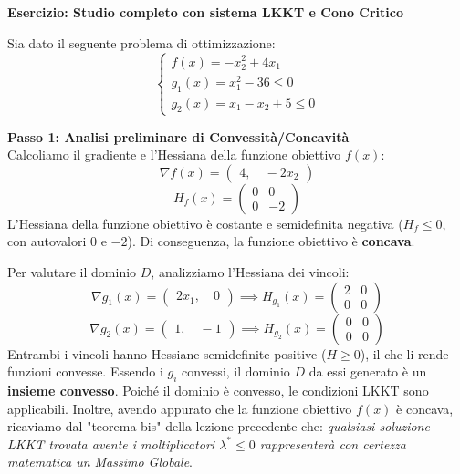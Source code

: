 \documentclass[12pt, a4paper]{article}
\begin{document}
	\textbf{Esercizio: Studio completo con sistema LKKT e Cono Critico}
	
	Sia dato il seguente problema di ottimizzazione:
	\[
	\begin{cases}
		f(x) = -x_2^2 + 4x_1 \\
		g_1(x) = x_1^2 - 36 \le 0 \\
		g_2(x) = x_1 - x_2 + 5 \le 0
	\end{cases}
	\]
	
	\textbf{Passo 1: Analisi preliminare di Convessità/Concavità}\\
	Calcoliamo il gradiente e l'Hessiana della funzione obiettivo $f(x)$:
	\[ \nabla f(x) = \begin{pmatrix} 4, \quad -2x_2 \end{pmatrix} \]
	\[ H_f(x) = \begin{pmatrix} 0 & 0 \\ 0 & -2 \end{pmatrix} \]
	L'Hessiana della funzione obiettivo è costante e semidefinita negativa ($H_f \le 0$, con autovalori $0$ e $-2$). Di conseguenza, la funzione obiettivo è \textbf{concava}. 
	
	Per valutare il dominio $D$, analizziamo l'Hessiana dei vincoli:
	\[ \nabla g_1(x) = \begin{pmatrix} 2x_1, \quad 0 \end{pmatrix} \implies H_{g_1}(x) = \begin{pmatrix} 2 & 0 \\ 0 & 0 \end{pmatrix} \]
	\[ \nabla g_2(x) = \begin{pmatrix} 1, \quad -1 \end{pmatrix} \implies H_{g_2}(x) = \begin{pmatrix} 0 & 0 \\ 0 & 0 \end{pmatrix} \]
	Entrambi i vincoli hanno Hessiane semidefinite positive ($H \ge 0$), il che li rende funzioni convesse. Essendo i $g_i$ convessi, il dominio $D$ da essi generato è un \textbf{insieme convesso}.
	Poiché il dominio è convesso, le condizioni LKKT sono applicabili. Inoltre, avendo appurato che la funzione obiettivo $f(x)$ è concava, ricaviamo dal "teorema bis" della lezione precedente che: \textit{qualsiasi soluzione LKKT trovata avente i moltiplicatori $\lambda^* \le 0$ rappresenterà con certezza matematica un Massimo Globale}.
	
\end{document}
